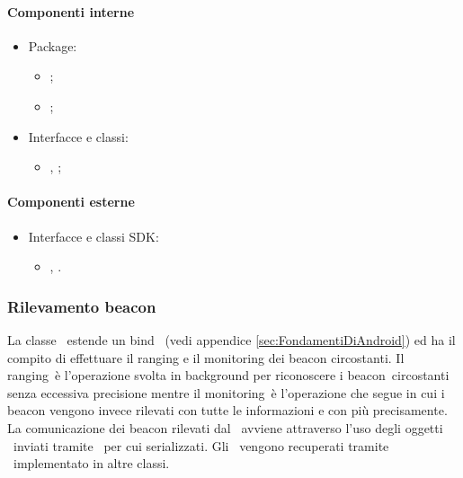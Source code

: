 \documentclass[../Funzionalita.tex]{subfiles}
\begin{document}
			\paragraph*{Componenti interne}
			\begin{itemize}
			
				\item Package:
				\begin{itemize}
					\item[] \view;
					\item[] \presenter;
				\end{itemize}
				
				\item Interfacce e classi:
				\begin{itemize}
					\item[] \HomeActivity, \HomeView;
				\end{itemize}
				
			\end{itemize}
			
			
			\paragraph*{Componenti esterne}
			
			\begin{itemize}
				\item Interfacce e classi SDK:
				\begin{itemize}
					\item[] \Activity, \InformationManager.
				\end{itemize}
			\end{itemize}
			
			
		\subsubsection{Rilevamento beacon}
			La classe \BeaconManagerAdapter\ estende un bind \Service\ (vedi appendice \ref{sec:FondamentiDiAndroid}) ed ha il compito di effettuare il \gls{ranging} e il \gls{monitoring} dei \gls{beacon} circostanti. Il \gls{ranging}\ 
è l'operazione svolta in background per riconoscere i \gls{beacon}\ 
circostanti senza eccessiva precisione mentre il \gls{monitoring}\ 
è l'operazione che segue in cui i beacon vengono invece rilevati con tutte le informazioni e con più precisamente.
			La comunicazione dei \gls{beacon} rilevati dal \model\ avviene attraverso l'uso degli oggetti \MyBeacon\ inviati tramite \Intent\ per cui serializzati. Gli \Intent\ vengono recuperati tramite \BroadcastReceiver\ implementato in altre classi.
			
\end{document}
